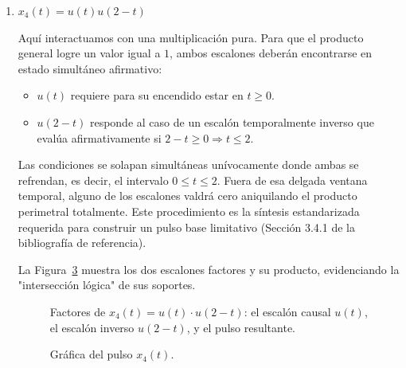 \documentclass[10pt,a4paper]{article}
\begin{document}
\begin{enumerate}[label=\textbf{\alph*)}]
		\begin{figure}[H]
			\centering
			
			\caption{Componentes de $x_3(t)$: el escalón $2u(t)$, la rampa negativa $-tu(t)$, la rampa $+(t-2)u(t-2)$, y la señal resultante.}
			\label{fig:ejer1c_sum}
		\end{figure}

		\begin{figure}[H]
			\centering
			
			\caption{Gráfica temporal de $x_3(t)$.}
			\label{fig:ejer1c}
		\end{figure}

		\item \textbf{$x_4(t)=u(t)u(2-t)$}
		
        Aquí interactuamos con una multiplicación pura. Para que el producto general logre un valor igual a $1$, ambos escalones deberán encontrarse en estado simultáneo afirmativo:
		\begin{itemize}
		    \item $u(t)$ requiere para su encendido estar en $t \ge 0$.
		    \item $u(2-t)$ responde al caso de un escalón temporalmente inverso que evalúa afirmativamente si $2-t \ge 0 \Rightarrow t \le 2$.
		\end{itemize}
        Las condiciones se solapan simultáneas unívocamente donde ambas se refrendan, es decir, el intervalo $0 \le t \le 2$. Fuera de esa delgada ventana temporal, alguno de los escalones valdrá cero aniquilando el producto perimetral totalmente. Este procedimiento es la síntesis estandarizada requerida para construir un pulso base limitativo (Sección 3.4.1 de la bibliografía de referencia).
		
		La Figura~\ref{fig:ejer1d_sum} muestra los dos escalones factores y su producto, evidenciando la "intersección lógica" de sus soportes.

		\begin{figure}[H]
			\centering
			
			\caption{Factores de $x_4(t) = u(t)\cdot u(2-t)$: el escalón causal $u(t)$, el escalón inverso $u(2-t)$, y el pulso resultante.}
			\label{fig:ejer1d_sum}
		\end{figure}

		\begin{figure}[H]
			\centering
			
			\caption{Gráfica del pulso $x_4(t)$.}
			\label{fig:ejer1d}
		\end{figure}


\end{enumerate}
\end{document}
